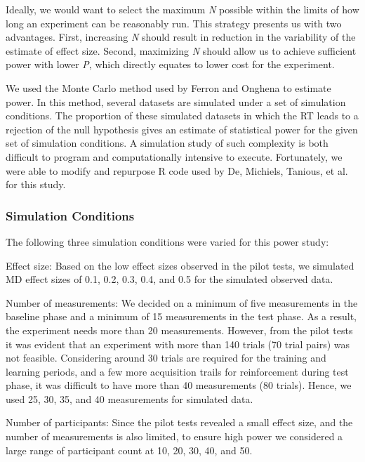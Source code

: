 \documentclass{article}
\begin{document}
Ideally, we would want to select the maximum \emph{N} possible within the limits of how long an experiment can be reasonably run. This strategy presents us with two advantages. First, increasing \emph{N} should result in reduction in the variability of the estimate of effect size. Second, maximizing \emph{N} should allow us to achieve sufficient power with lower \emph{P}, which directly equates to lower cost for the experiment.

We used the Monte Carlo method used by Ferron and Onghena \textcite{Ferron1996} to estimate power. In this method, several datasets are simulated under a set of simulation conditions. The proportion of these simulated datasets in which the RT leads to a rejection of the null hypothesis gives an estimate of statistical power for the given set of simulation conditions. A simulation study of such complexity is both difficult to program and computationally intensive to execute. Fortunately, we were able to modify and repurpose R code used by De, Michiels, Tanious, et al. \textcite{De2020} for this study. 

\subsubsection{Simulation Conditions}

The following three simulation conditions were varied for this power study:

Effect size: Based on the low effect sizes observed in the pilot tests, we simulated MD effect sizes of 0.1, 0.2, 0.3, 0.4, and 0.5 for the simulated observed data.

Number of measurements: We decided on a minimum of five measurements in the baseline phase and a minimum of 15 measurements in the test phase. As a result, the experiment needs more than 20 measurements. However, from the pilot tests it was evident that an experiment with more than 140 trials (70 trial pairs) was not feasible. Considering around 30 trials are required for the training and learning periods, and a few more acquisition trails for reinforcement during test phase, it was difficult to have more than 40 measurements (80 trials). Hence, we used 25, 30, 35, and 40 measurements for simulated data. 

Number of participants: Since the pilot tests revealed a small effect size, and the number of measurements is also limited, to ensure high power we considered a large range of participant count at 10, 20, 30, 40, and 50. 
\end{document}
